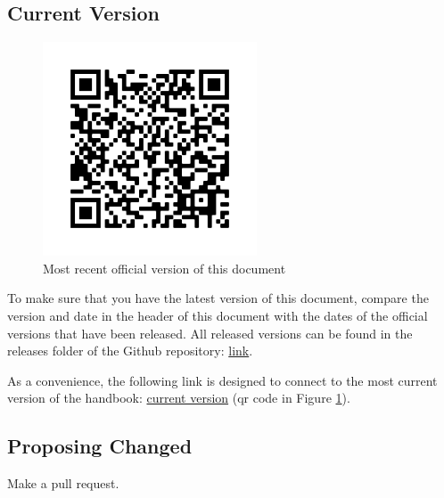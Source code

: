 \documentclass[letterpaper, 11pt]{article}
\begin{document}
	\subsection{Current Version}
		\begin{figure}
			\vspace{-30pt}
			\begin{center}
				\includegraphics[width=2.5in]{images/qr_code_current_release.png}
			\end{center}
			\vspace{-30pt}
			\caption{Most recent official version of this document}
			\label{fig:qr_current}
			\vspace{-10pt}
		\end{figure}
		To make sure that you have the latest version of this document, compare the version and date in the header of this document with the dates of the official versions that have been released.
		All released versions can be found in the releases folder of the Github repository: \href{https://github.com/djp3/WestmontFacultyHandbook/tree/main/releases}{link}.

		As a convenience, the following link is designed to connect to the most current version of the handbook:
		\href{https://github.com/djp3/WestmontFacultyHandbook/blob/main/releases/handbook.current.pdf}{current version} (qr code in Figure \ref{fig:qr_current}).

	\subsection{Proposing Changed}
		Make a pull request.


		
		
\end{document}
